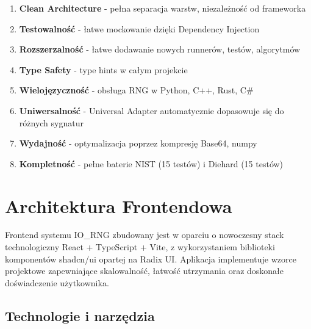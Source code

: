 \documentclass[12pt,a4paper]{article}
\begin{document}
\begin{tcolorbox}[colback=green!5!white,colframe=green!75!black,title=Kluczowe zalety]
\begin{enumerate}
    \item \textbf{Clean Architecture} - pełna separacja warstw, niezależność od frameworka
    \item \textbf{Testowalność} - łatwe mockowanie dzięki Dependency Injection
    \item \textbf{Rozszerzalność} - łatwe dodawanie nowych runnerów, testów, algorytmów
    \item \textbf{Type Safety} - type hints w całym projekcie
    \item \textbf{Wielojęzyczność} - obsługa RNG w Python, C++, Rust, C\#
    \item \textbf{Uniwersalność} - Universal Adapter automatycznie dopasowuje się do różnych sygnatur
    \item \textbf{Wydajność} - optymalizacja poprzez kompresję Base64, numpy
    \item \textbf{Kompletność} - pełne baterie NIST (15 testów) i Diehard (15 testów)
\end{enumerate}
\end{tcolorbox}

\newpage
\section{Architektura Frontendowa}

Frontend systemu IO\_RNG zbudowany jest w oparciu o nowoczesny stack technologiczny React + TypeScript + Vite, z wykorzystaniem biblioteki komponentów shadcn/ui opartej na Radix UI. Aplikacja implementuje wzorce projektowe zapewniające skalowalność, łatwość utrzymania oraz doskonałe doświadczenie użytkownika.

\subsection{Technologie i narzędzia}
\end{document}
